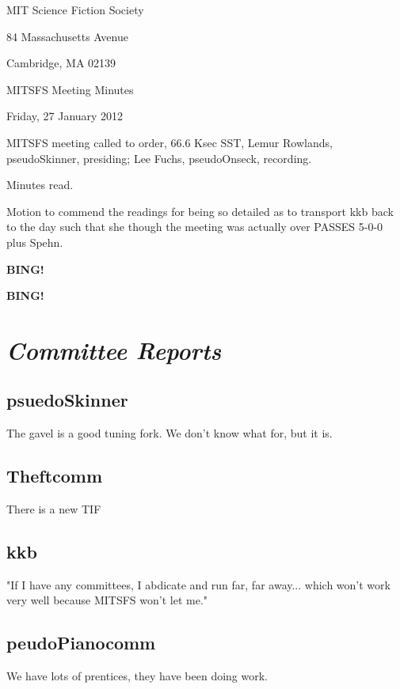 \documentclass[10pt]{article}
\newcommand{\bing}{{\bf BING!} }
\newcommand{\goto}[1]{\bing \vskip 12pt \section*{{\em{#1}}}}
\newcommand{\meetingdate}{Friday, 27 January 2012}
\begin{document}
\begin{center}

MIT Science Fiction Society

84 Massachusetts Avenue

Cambridge, MA 02139

\vspace{12pt}

MITSFS Meeting Minutes

\meetingdate

\end{center}

\vspace{18pt}

\setlength{\parskip}{6pt}

\noindent
MITSFS meeting called to order, 66.6 Ksec SST,
Lemur Rowlands, pseudoSkinner, presiding; Lee Fuchs, pseudoOnseck, recording.

Minutes read.

Motion to commend the readings for being so detailed as to transport kkb back to the day such that she though the meeting was actually over PASSES 5-0-0 plus Spehn.

\bing

\goto{Committee Reports}

\subsection*{psuedoSkinner}

The gavel is a good tuning fork. We don't know what for, but it is.

\subsection*{Theftcomm}

There is a new TIF

\subsection*{kkb}

"If I have any committees, I abdicate and run far, far away... which won't work very well because MITSFS won't let me."

\subsection*{peudoPianocomm}

We have lots of prentices, they have been doing work.
\end{document}
